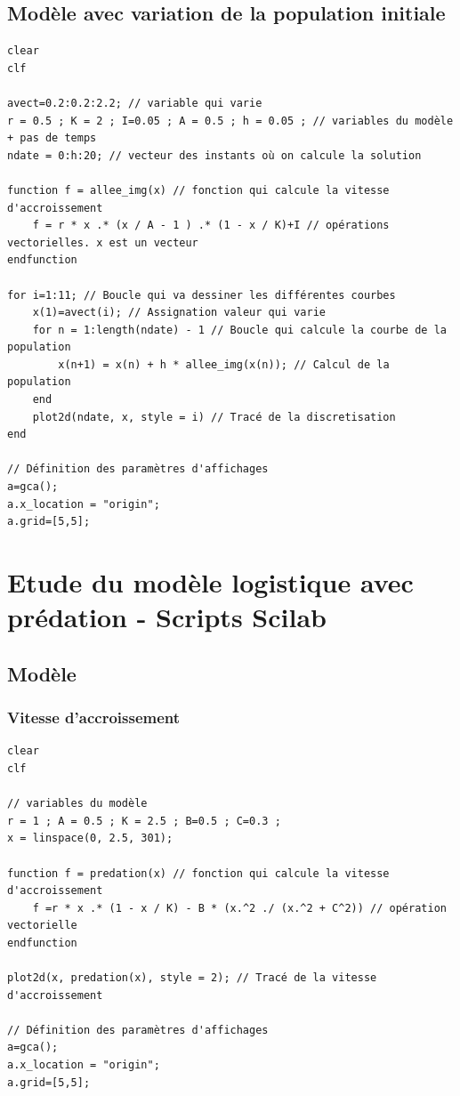 \documentclass{article}
\begin{document}
\subsection{Modèle avec variation de la population initiale}

\begin{verbatim}
clear
clf

avect=0.2:0.2:2.2; // variable qui varie
r = 0.5 ; K = 2 ; I=0.05 ; A = 0.5 ; h = 0.05 ; // variables du modèle + pas de temps
ndate = 0:h:20; // vecteur des instants où on calcule la solution

function f = allee_img(x) // fonction qui calcule la vitesse d'accroissement
    f = r * x .* (x / A - 1 ) .* (1 - x / K)+I // opérations vectorielles. x est un vecteur
endfunction

for i=1:11; // Boucle qui va dessiner les différentes courbes
    x(1)=avect(i); // Assignation valeur qui varie
    for n = 1:length(ndate) - 1 // Boucle qui calcule la courbe de la population
        x(n+1) = x(n) + h * allee_img(x(n)); // Calcul de la population
    end 
    plot2d(ndate, x, style = i) // Tracé de la discretisation
end

// Définition des paramètres d'affichages
a=gca();
a.x_location = "origin";
a.grid=[5,5];
\end{verbatim}

\section{Etude du modèle logistique avec prédation - Scripts Scilab}

\subsection{Modèle}

\subsubsection{Vitesse d'accroissement}

\begin{verbatim}
clear
clf

// variables du modèle
r = 1 ; A = 0.5 ; K = 2.5 ; B=0.5 ; C=0.3 ;
x = linspace(0, 2.5, 301);

function f = predation(x) // fonction qui calcule la vitesse d'accroissement
    f =r * x .* (1 - x / K) - B * (x.^2 ./ (x.^2 + C^2)) // opération vectorielle
endfunction

plot2d(x, predation(x), style = 2); // Tracé de la vitesse d'accroissement

// Définition des paramètres d'affichages
a=gca();
a.x_location = "origin";
a.grid=[5,5];
\end{verbatim}
\end{document}
